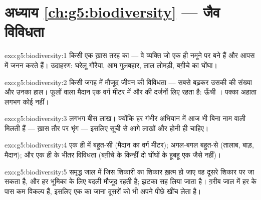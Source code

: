 \section*{अध्याय \ref{ch:g5:biodiversity} --- जैव विविधता}

\begin{solution}{exo:g5:biodiversity:1}
किसी एक ख़ास तरह का  --- वे व्यक्ति जो एक ही नमूने पर बने हैं और
आपस में जनन करते हैं। उदाहरण: घरेलू गौरैया, आम गुलबहार, लाल लोमड़ी,
बग़ीचे का घोंघा।
\end{solution}

\begin{solution}{exo:g5:biodiversity:2}
किसी जगह में मौजूद जीवन की विविधता --- सबसे बढ़कर उसकी  की
संख्या और उनका हाल। फूलों वाला मैदान एक वर्ग मीटर में  और 
की दर्जनों  लिए रहता है: ऊँची । पक्का अहाता लगभग
कोई नहीं।
\end{solution}

\begin{solution}{exo:g5:biodiversity:3}
लगभग बीस लाख। क्योंकि हर गंभीर अभियान में आज भी बिना नाम वाली
 मिलती हैं --- ख़ास तौर पर भृंग --- इसलिए सूची से आगे लाखों
और होनी ही चाहिए।
\end{solution}

\begin{solution}{exo:g5:biodiversity:4}
एक ही  में बहुत-सी  (मैदान का वर्ग मीटर); अगल-बगल
बहुत-से  (तालाब, बाड़, मैदान); और एक ही  के भीतर विविधता
(बग़ीचे के किन्हीं दो घोंघों के  हूबहू एक जैसे नहीं)।
\end{solution}

\begin{solution}{exo:g5:biodiversity:5}
समृद्ध जाल में जिस शिकारी का शिकार ख़त्म हो जाए वह दूसरे शिकार पर जा
सकता है, और हर भूमिका के लिए बदली मौजूद रहती है; झटका सह लिया जाता है।
ग़रीब जाल में हर  के पास कम विकल्प हैं, इसलिए एक का जाना दूसरों
को भी अपने पीछे खींच लेता है।
\end{solution}

